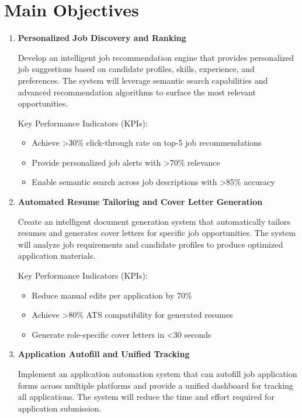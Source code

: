 \documentclass[12pt,a4paper]{report}
\begin{document}
\section*{Main Objectives}

\begin{enumerate}[label=\textbf{O\arabic*.}, align=left]
    \item \textbf{Personalized Job Discovery and Ranking}
    
    Develop an intelligent job recommendation engine that provides personalized job suggestions based on candidate profiles, skills, experience, and preferences. The system will leverage semantic search capabilities and advanced recommendation algorithms to surface the most relevant opportunities.
    
    Key Performance Indicators (KPIs):
    \begin{itemize}
        \item Achieve >30\% click-through rate on top-5 job recommendations
        \item Provide personalized job alerts with >70\% relevance
        \item Enable semantic search across job descriptions with >85\% accuracy
    \end{itemize}
    
    \item \textbf{Automated Resume Tailoring and Cover Letter Generation}
    
    Create an intelligent document generation system that automatically tailors resumes and generates cover letters for specific job opportunities. The system will analyze job requirements and candidate profiles to produce optimized application materials.
    
    Key Performance Indicators (KPIs):
    \begin{itemize}
        \item Reduce manual edits per application by 70\%
        \item Achieve >80\% ATS compatibility for generated resumes
        \item Generate role-specific cover letters in <30 seconds
    \end{itemize}
    
    \item \textbf{Application Autofill and Unified Tracking}
    
    Implement an application automation system that can autofill job application forms across multiple platforms and provide a unified dashboard for tracking all applications. The system will reduce the time and effort required for application submission.
    

\end{enumerate}
\end{document}

